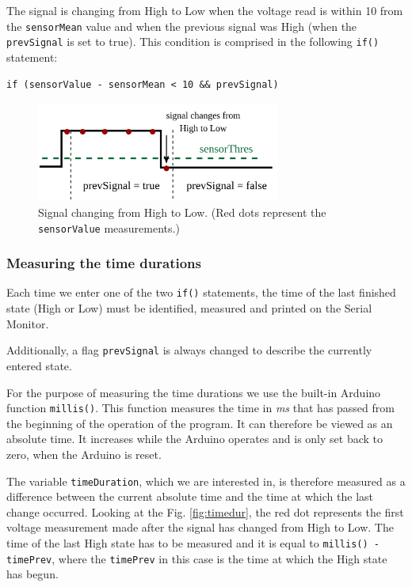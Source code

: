 \documentclass[10pt]{report}
\begin{document}
The signal is changing from High to Low when the voltage read is within 10 from the \verb|sensorMean| value and when the previous signal was High (when the \verb|prevSignal| is set to true). This condition is comprised in the following \verb|if()| statement:

\begin{lstlisting}
if (sensorValue - sensorMean < 10 && prevSignal)
\end{lstlisting}

\begin{figure}[H]
\centering\includegraphics[width=8cm]{hightolow}
\caption{Signal changing from High to Low. (Red dots represent the \texttt{sensorValue} measurements.)}				
\label{fig:arduino_code}
\end{figure}

\subsubsection{Measuring the time durations}

Each time we enter one of the two \verb|if()| statements, the time of the last finished state (High or Low) must be identified, measured and printed on the Serial Monitor.

Additionally, a flag \verb|prevSignal| is always changed to describe the currently entered state.

For the purpose of measuring the time durations we use the built-in Arduino function \verb|millis()|. This function measures the time in \textit{ms} that has passed from the beginning of the operation of the program. It can therefore be viewed as an absolute time. It increases while the Arduino operates and is only set back to zero, when the Arduino is reset.

The variable \verb|timeDuration|, which we are interested in, is therefore measured as a difference between the current absolute time and the time at which the last change occurred. Looking at the Fig. \ref{fig:timedur}, the red dot represents the first voltage measurement made after the signal has changed from High to Low. The time of the last High state has to be measured and it is equal to \verb|millis() - timePrev|, where the 
\textcolor{cadr}{\texttt{timePrev}} in this case is the time at which the High state has begun.
\end{document}
